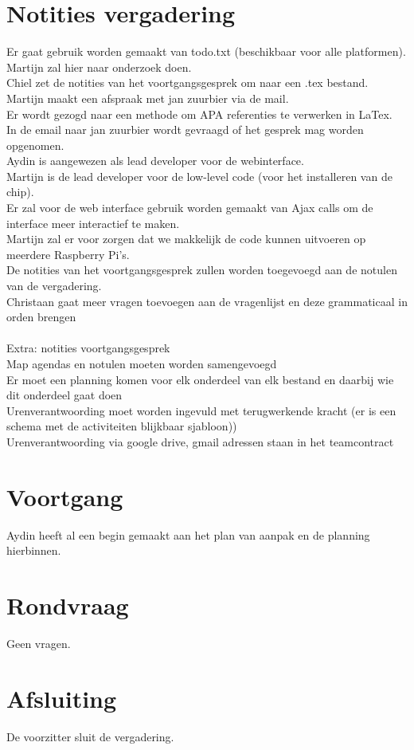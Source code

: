 \documentclass[dutch]{hu}
\begin{document}
\section{Notities vergadering}
Er gaat gebruik worden gemaakt van todo.txt (beschikbaar voor alle platformen). Martijn zal hier naar onderzoek doen. \\

Chiel zet de notities van het voortgangsgesprek om naar een .tex bestand. \\

Martijn maakt een afspraak met jan zuurbier via de mail. \\

Er wordt gezogd naar een methode om APA referenties te verwerken in LaTex. \\

In de email naar jan zuurbier wordt gevraagd of het gesprek mag worden opgenomen. \\

Aydin is aangewezen als lead developer voor de webinterface. \\

Martijn is de lead developer voor de low-level code (voor het installeren van de chip). \\

Er zal voor de web interface gebruik worden gemaakt van Ajax calls om de interface meer interactief te maken. \\

Martijn zal er voor zorgen dat we makkelijk de code kunnen uitvoeren op meerdere Raspberry Pi's. \\

De notities van het voortgangsgesprek zullen worden toegevoegd aan de notulen van de vergadering. \\

Christaan gaat meer vragen toevoegen aan de vragenlijst en deze grammaticaal in orden brengen \\ \\

Extra: notities voortgangsgesprek \\
Map agendas en notulen moeten worden samengevoegd \\
Er moet een planning komen voor elk onderdeel van elk bestand en daarbij wie dit onderdeel gaat doen \\
Urenverantwoording moet worden ingevuld met terugwerkende kracht (er is een schema met de activiteiten blijkbaar sjabloon)) \\
Urenverantwoording via google drive, gmail adressen staan in het teamcontract \\

\section{Voortgang}
Aydin heeft al een begin gemaakt aan het plan van aanpak en de planning hierbinnen.

\section{Rondvraag}
Geen vragen.

\section{Afsluiting}
De voorzitter sluit de vergadering.
\end{document}

